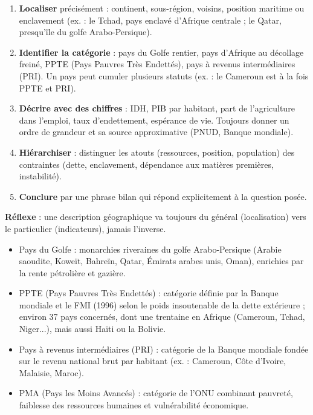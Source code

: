 \documentclass[11pt]{article}
\newcommand{\cle}[1]{{\popxbold\color{popdark}#1}}
\begin{document}
\begin{methode}
\begin{enumerate}
\item \textbf{Localiser} précisément : continent, sous-région, voisins, position maritime ou enclavement (ex. : le Tchad, pays enclavé d'Afrique centrale ; le Qatar, presqu'île du golfe Arabo-Persique).
\item \textbf{Identifier la catégorie} : pays du Golfe rentier, pays d'Afrique au décollage freiné, PPTE (Pays Pauvres Très Endettés), pays à revenus intermédiaires (PRI). Un pays peut cumuler plusieurs statuts (ex. : le Cameroun est à la fois PPTE et PRI).
\item \textbf{Décrire avec des chiffres} : IDH, PIB par habitant, part de l'agriculture dans l'emploi, taux d'endettement, espérance de vie. Toujours donner un ordre de grandeur et sa source approximative (PNUD, Banque mondiale).
\item \textbf{Hiérarchiser} : distinguer les atouts (ressources, position, population) des contraintes (dette, enclavement, dépendance aux matières premières, instabilité).
\item \textbf{Conclure} par une phrase bilan qui répond explicitement à la question posée.
\end{enumerate}
\textbf{Réflexe} : une description géographique va toujours du général (localisation) vers le particulier (indicateurs), jamais l'inverse.
\end{methode}

\begin{definition}
\begin{itemize}
\item \cle{Pays du Golfe} : monarchies riveraines du golfe Arabo-Persique (Arabie saoudite, Koweït, Bahreïn, Qatar, Émirats arabes unis, Oman), enrichies par la rente pétrolière et gazière.
\item \cle{PPTE} (Pays Pauvres Très Endettés) : catégorie définie par la Banque mondiale et le FMI (1996) selon le poids insoutenable de la dette extérieure ; environ 37 pays concernés, dont une trentaine en Afrique (Cameroun, Tchad, Niger...), mais aussi Haïti ou la Bolivie.
\item \cle{Pays à revenus intermédiaires} (PRI) : catégorie de la Banque mondiale fondée sur le revenu national brut par habitant (ex. : Cameroun, Côte d'Ivoire, Malaisie, Maroc).
\item \cle{PMA} (Pays les Moins Avancés) : catégorie de l'ONU combinant pauvreté, faiblesse des ressources humaines et vulnérabilité économique.
\end{itemize}
\end{definition}
\end{document}
